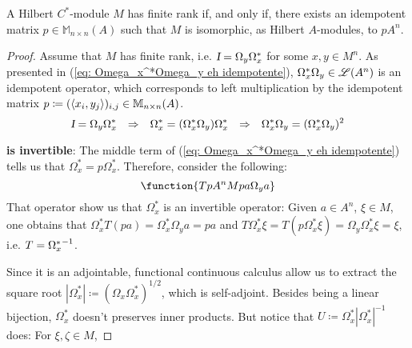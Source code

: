 \begin{teorema}\label{teo: M rank finito sse M = pA^n}
A Hilbert $C^*$-module $M$ has finite rank if, and only if, there exists an idempotent matrix $p\in \mathbb M_{n\times n}(A)$ such that $M$ is isomorphic, as Hilbert $A$-modules, to $p A^{n}$.
\begin{proof}
Assume that $M$ has finite rank, i.e. $\textsl{I} = \Omega_y\Omega_x^*$ for some $x,y \in M^n$. As presented in (\ref{eq: Omega_x^*Omega_y eh idempotente}), $\Omega_x^*\Omega_y \in \mathscr L(A^n)$ is an idempotent operator, which corresponds to left multiplication by the idempotent matrix $p\coloneqq (\langle {x_i},{y_j}\rangle)_{i,j} \in \mathbb M_{n\times n}(A)$.
\begin{equation}
\label{eq: Omega_x^*Omega_y eh idempotente}
    \textsl{I} = \Omega_y \Omega_x^* \hspace{0.25cm} \Rightarrow \hspace{0.25cm} \Omega_x^* = (\Omega_x^*\Omega_y) \Omega_x^* \hspace{0.25cm} \Rightarrow \hspace{0.25cm} \Omega_x^*\Omega_y = (\Omega_x^*\Omega_y)^2
\end{equation}
\begin{itroman}
    \item[]  \textbf{is invertible}: The middle term of (\ref{eq: Omega_x^*Omega_y eh idempotente}) tells us that $\Omega_x^*= p\Omega_x^* $. Therefore, consider the following:
\begin{equation*}
    \function{T{pA^n}{M}{pa}{\Omega_ya}}
\end{equation*}
That operator show us that $\Omega_x^*$ is an invertible operator: Given $a\in A^n$, $\xi \in M$,  one obtains that $\Omega_x^* T(pa) = \Omega_x^*\Omega_ya = pa$ and $T\Omega_x^* \xi = T(p\Omega_x^*\xi) = \Omega_y\Omega_x^*\xi = \xi$, i.e. $T = {\Omega_x^*}^{-1}$.
\end{itroman}
Since it is an adjointable, functional continuous calculus allow us to extract the square root $|\Omega_x^*| \coloneqq (\Omega_x\Omega_x^*)^{1/2}$, which is self-adjoint. Besides being a linear bijection, $\Omega_x^*$ doesn't preserves inner products. But notice that $U \coloneqq \Omega_x^*|\Omega_x^*|^{-1}$ does: For $\xi,\zeta \in M$,

\end{proof}
\end{teorema}
